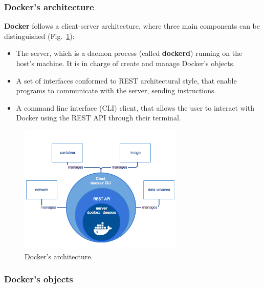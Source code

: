 \documentclass[a4paper,12pt]{article}
\def\myfig#1{Fig.~#1\xspace}
\begin{document}
\subsubsection{Docker's architecture}

\textbf{Docker} follows a client-server architecture, where three main
components can be distinguished (\myfig{\ref{fig:docker-architecture}}):
\begin{itemize}
  \item The server, which is a daemon process (called \textbf{dockerd}) running
  on the host's machine. It is in charge of create and manage Docker's objects.
  \item A set of interfaces conformed to REST architectural style, that enable
  programs to communicate with the server, sending instructions.
  \item A command line interface (CLI) client, that allows the user to interact
  with Docker using the REST API through their terminal.\cite{docker_architecture}
\end{itemize}   

\begin{figure}[h]
  \centerline{\includegraphics[width=0.7\textwidth]{engine-components-flow.png}}
  \caption{Docker's architecture.}
  \label{fig:docker-architecture}
  \end{figure}

\subsubsection{Docker's objects}
\end{document}
